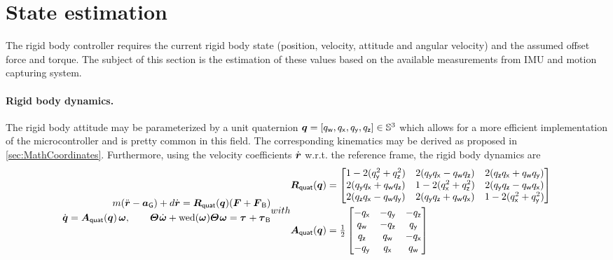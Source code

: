 \section{State estimation}\label{sec:RealizationStateEstimation}
The rigid body controller requires the current rigid body state (position, velocity, attitude and angular velocity) and the assumed offset force and torque.
The subject of this section is the estimation of these values based on the available measurements from IMU and motion capturing system.

\paragraph{Rigid body dynamics.}
The rigid body attitude may be parameterized by a unit quaternion $\boldsymbol{q} = [q_{\mathsf{w}}, q_{\mathsf{x}}, q_{\mathsf{y}}, q_{\mathsf{z}}] \in \mathbb{S}^3$ which allows for a more efficient implementation of the microcontroller and is pretty common in this field.
The corresponding kinematics may be derived as proposed in \autoref{sec:MathCoordinates}.
Furthermore, using the velocity coefficients $\dot{\boldsymbol{r}}$ w.r.t. the reference frame, the rigid body dynamics are
\begin{subequations}\label{eq:RealizationStateDyn}
\begin{align}
 m (\rdd - \gravityAcc) + d \rd = \RotMatQuat(\quat) (\F + \FB)
\\
 \quatd = \kinMatQuat(\quat) \, \w, \qquad
 \bodyMOI{}{} \dot{\w} + \wedOp(\w) \bodyMOI{}{} \w = \bodyTorque{}{} + \tauB
\end{align}
with
\begin{align}
 \RotMatQuat(\quat) &=
 \begin{bmatrix} 
  1 - 2(\quaty^{2} + \quatz^{2}) & 2(\quaty\quatx -\quatw\quatz)  & 2(\quatz\quatx + \quatw\quaty) \\
  2(\quaty\quatx + \quatw\quatz) & 1 - 2(\quatx^{2} + \quatz^{2}) & 2(\quaty\quatz - \quatw\quatx) \\
  2(\quatz\quatx - \quatw\quaty) & 2(\quaty\quatz + \quatw\quatx) & 1 - 2(\quatx^{2} + \quaty^{2})
 \end{bmatrix}
\\
 \kinMatQuat(\quat) &=
 \tfrac{1}{2} \begin{bmatrix}
  -\quatx & -\quaty & -\quatz \\
  \quatw & -\quatz &  \quaty \\
  \quatz &  \quatw & -\quatx \\
  -\quaty &  \quatx &  \quatw
 \end{bmatrix}
\end{align}
\end{subequations}


